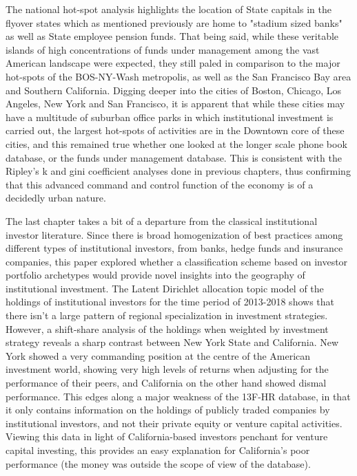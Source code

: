 The national hot-spot analysis highlights the location of State capitals in the flyover states which as mentioned previously are home to "stadium sized banks" as well as State employee pension funds.  That being said, while these veritable islands of high concentrations of funds under management among the vast American landscape were expected, they still paled in comparison to the major hot-spots of the BOS-NY-Wash metropolis, as well as the San Francisco Bay area and Southern California.   Digging deeper into the cities of Boston, Chicago, Los Angeles, New York and San Francisco, it is apparent that while these cities may have a multitude of suburban office parks in which institutional investment is carried out, the largest hot-spots of activities are in the Downtown core of these cities, and this remained true whether one looked at the longer scale phone book database, or the funds under management database.  This is consistent with the Ripley's k and gini coefficient analyses done in previous chapters, thus confirming that this advanced command and control function of the economy is of a decidedly urban nature.  
     
The last chapter takes a bit of a departure from the classical institutional investor literature.  Since there is broad homogenization of best practices among different types of institutional investors, from banks, hedge funds and insurance companies, this paper explored whether a classification scheme based on investor portfolio archetypes would provide novel insights into the geography of institutional investment.  The Latent Dirichlet allocation topic model of the holdings of institutional investors for the time period of 2013-2018 shows that there isn't a large pattern of regional specialization in investment strategies.  However, a shift-share analysis of the holdings when weighted by investment strategy reveals a sharp contrast between New York State and California.  New York showed a very commanding position at the centre of the American investment world, showing very high levels of returns when adjusting for the performance of their peers, and California on the other hand showed dismal performance.  This edges along a major weakness of the 13F-HR database, in that it only contains information on the holdings of publicly traded companies by institutional investors, and not their private equity or venture capital activities.  Viewing this data in light of California-based investors penchant for venture capital investing, this provides an easy explanation for California's poor performance (the money was outside the scope of view of the database).  
 
















